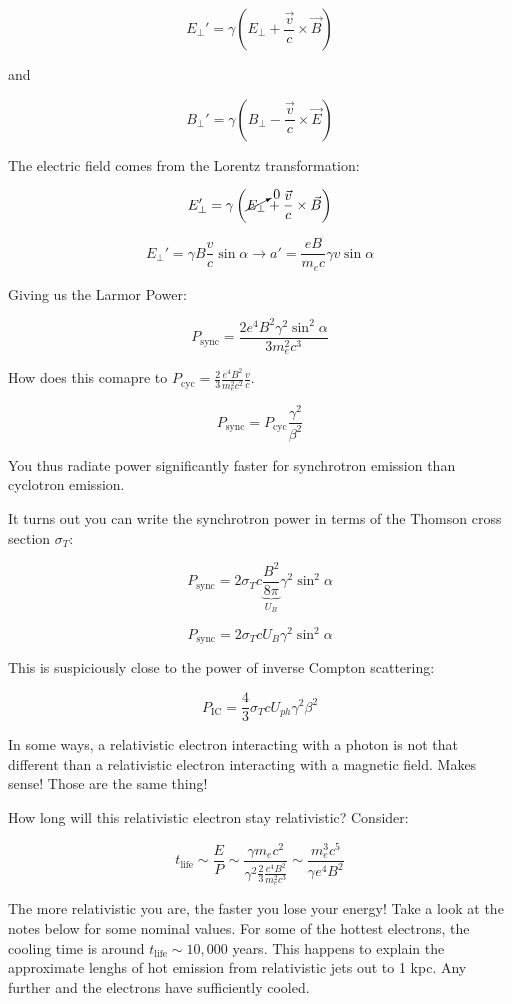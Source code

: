 \documentclass{article}
\def\Bfield{{\vec{B}}}
\def\Efield{{\vec {E}}}
\begin{document}
$$
E_\perp' = \gamma \left( E_\perp + \frac{\vec v}{c} \times \Bfield\right)
$$

and

$$
B_\perp' = \gamma \left( B_\perp - \frac{\vec v}{c} \times \Efield\right)
$$

The electric field comes from the Lorentz transformation:

$$
E_\perp' = \gamma \left( \cancelto{0}{E_\perp} + \frac{\vec v}{c} \times \Bfield\right)
$$

$$
E_\perp' = \gamma B \frac{v}{c} \sin\alpha \rightarrow a' = \frac{eB}{m_e c}\gamma v\sin\alpha
$$

Giving us the Larmor Power:

$$
P_\text{sync} = \frac{2e^4 B^2 \gamma^2 \sin^2\alpha}{3m_e^2 c^3}
$$

How does this comapre to $P_\text{cyc} = \frac23 \frac{e^4 B^2}{m_e^2 c^2}\frac{v}{c}$.

$$
P_\text{sync} = P_\text{cyc}\frac{\gamma^2}{\beta^2}
$$

You thus radiate power significantly faster for synchrotron emission than cyclotron emission.

It turns out you can write the synchrotron power in terms of the Thomson cross section $\sigma_T$:

$$
P_\text{sync} = 2 \sigma_T c \underbrace{\frac{B^2}{8\pi}}_{U_B} \gamma^2 \sin^2\alpha
$$

$$
P_\text{sync} = 2 \sigma_T c U_B \gamma^2 \sin^2\alpha
$$

This is suspiciously close to the power of inverse Compton scattering:

$$
P_\text{IC} = \frac43 \sigma_T c U_{ph} \gamma^2 \beta^2
$$

In some ways, a relativistic electron interacting with a photon is not that different than a relativistic electron interacting with a magnetic field. Makes sense! Those are the same thing!

How long will this relativistic electron stay relativistic? Consider:

$$
t_\text{life} \sim \frac{E}{P} \sim \frac{\gamma m_e c^2}{\gamma^2 \frac23 \frac{e^4 B^2}{m_e^2 c^3}} \sim \frac{m_e^3 c^5}{\gamma e^4 B^2}
$$

The more relativistic you are, the faster you lose your energy! Take a look at the notes below for some nominal values. For some of the hottest electrons, the cooling time is around $t_\text{life} \sim 10,000$ years. This happens to explain the approximate lenghs of hot emission from relativistic jets out to 1 kpc. Any further and the electrons have sufficiently cooled.
\end{document}
